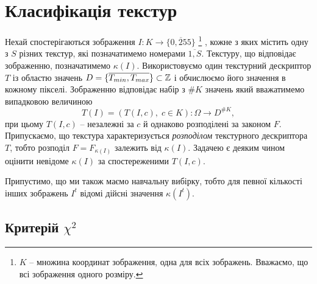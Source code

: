 
\section{Класифікація текстур}\label{section1.3}

Нехай спостерігаються зображення $I \colon K \to \{\overline{0,255}\}$ 
\footnote{$K$ -- множина координат зображення, одна для всіх зображень. Вважаємо, що всі зображення одного розміру.}
, кожне з яких містить одну з $S$ різних текстур, які позначатимемо номерами $\overline{1,S}$.
Текстуру, що відповідає зображенню, позначатимемо $\kappa(I)$.
Використовуємо один текстурний дескриптор $T$ із областю значень $D = \{\overline{T_{min}, T_{max}}\} \subset \mathbb Z$ і обчислюємо його значення в кожному пікселі. 
Зображенню відповідає набір з $\# K$ значень який вважатимемо випадковою величиною
\[ T(I) = \left(T(I,c),\; c\in K\right) \colon \Omega \to D^{\# K}, \]
при цьому $T(I,c)$ -- незалежні за $c$ й однаково розподілені за законом $F$.
Припускаємо, що текстура характеризується \emph{розподілом} текстурного дескриптора $T$, тобто розподіл $F = F_{\kappa(I)}$ залежить від $\kappa(I)$.
Задачею є деяким чином оцінити невідоме $\kappa(I)$ за спостереженими $T(I,c)$.


Припустимо, що ми також маємо навчальну вибірку, тобто для певної кількості інших зображень $I^t$ відомі дійсні значення $\kappa(I^t)$. 

\subsection{Критерій $\chi^2$}

